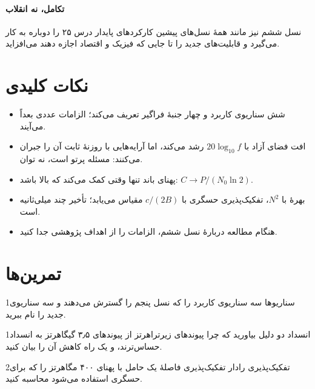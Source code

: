 \documentclass[11pt,a4paper]{article}
\begin{document}
\paragraph{تکامل، نه انقلاب} نسل ششم نیز مانند همهٔ نسل‌های پیشین کارکردهای پایدار درس ۲۵ را دوباره به کار می‌گیرد و قابلیت‌های جدید را تا جایی که فیزیک و
اقتصاد اجازه دهند می‌افزاید.

\section{نکات کلیدی}
\begin{takeawaybox}
\begin{itemize}
  \item {} شش سناریوی کاربرد و چهار جنبهٔ فراگیر تعریف می‌کند؛ الزامات عددی بعداً می‌آیند.
  \item افت فضای آزاد با $20\log_{10} f$ رشد می‌کند، اما آرایه‌هایی با روزنهٔ ثابت آن را جبران می‌کنند: مسئله پرتو است، نه توان.
  \item پهنای باند تنها وقتی کمک می‌کند که  بالا باشد: $C \to P/(N_0 \ln 2)$.
  \item بهرهٔ  با $N^2$، تفکیک‌پذیری حسگری با $c/(2B)$ مقیاس می‌یابد؛ تأخیر  چند میلی‌ثانیه است.
  \item هنگام مطالعه دربارهٔ نسل ششم، الزامات را از اهداف پژوهشی جدا کنید.
\end{itemize}
\end{takeawaybox}

\section{تمرین‌ها}

\begin{exercisebox}{1}{سناریوها}\label{exr:scen}
سه سناریوی کاربرد  را که نسل پنجم را گسترش می‌دهند و سه سناریوی جدید را نام ببرید.
\end{exercisebox}

\begin{exercisebox}{1}{انسداد}\label{exr:block}
دو دلیل بیاورید که چرا پیوندهای زیرتراهرتز از پیوندهای ۳٫۵ گیگاهرتز به انسداد حساس‌ترند، و یک راه کاهش آن را بیان کنید.
\end{exercisebox}

\begin{exercisebox}{2}{تفکیک‌پذیری رادار}\label{exr:range}
تفکیک‌پذیری فاصلهٔ یک حامل  با پهنای ۴۰۰ مگاهرتز را که برای حسگری استفاده می‌شود محاسبه کنید.
\end{exercisebox}
\end{document}
